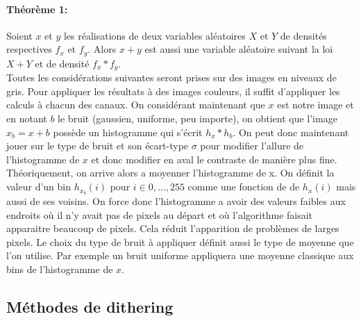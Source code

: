 \documentclass{article}
\begin{document}
\paragraph*{Théorème 1:} Soient $x$ et $y$ les réalisations de deux variables aléatoires $X$ et $Y$ de densités respectives $f_x$ et $f_y$. Alors $x+y$ est aussi une variable aléatoire suivant la loi $X+Y$ et de densité $f_x * f_y$.\\

Toutes les considérations suivantes seront prises sur des images en niveaux de gris. Pour appliquer les résultats à des images couleurs, il suffit d'appliquer les calculs à chacun des canaux. On considérant maintenant que $x$ est notre image et en notant $b$ le bruit (gaussien, uniforme, peu importe), on obtient que l'image $x_b = x+b$ possède un histogramme qui s'écrit $h_x * h_b$. On peut donc maintenant jouer sur le type de bruit et son écart-type $\sigma$ pour modifier l'allure de l'histogramme  de $x$ et donc modifier en aval le contraste de manière plus fine.\\
Théoriquement, on arrive alors a moyenner l'histogramme de x. On définit la valeur d'un bin $h_{x_b}(i)$ pour $i \in {0,...,255}$ comme une fonction de de $h_x(i)$ mais aussi de ses voisins. On force donc l'histogramme a avoir des valeurs faibles aux endroits où il n'y avait pas de pixels au départ et où l'algorithme faisait apparaitre beaucoup de pixels. Cela  réduit l'apparition de problèmes de larges pixels. Le choix du type de bruit à appliquer définit aussi le type de moyenne que l'on utilise. Par exemple un bruit uniforme appliquera une moyenne classique aux bins de l'histogramme de $x$.

\subsection{Méthodes de dithering}
\end{document}
